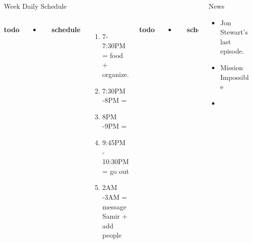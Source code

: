\documentclass[serif, mathserif, final]{beamer}
\begin{document}
\begin{frame}
\begin{columns}
\begin{column}{0.50\linewidth}
\begin{block}{Week Daily Schedule}
\begin{columns}
          \textbf{\small todo}\\
          \begin{itemize} 
            \tiny \item \tiny
          \end{itemize}
          \textbf{\small schedule}\\ 
          \begin{enumerate}
            \tiny \item \tiny 7-7:30PM = food + organize.  
            \tiny \item \tiny 7:30PM -8PM = 
            \tiny \item \tiny 8PM -9PM = 
            \tiny \item \tiny 9:45PM - 10:30PM = go out 
            \tiny \item \tiny 2AM -3AM =  message Samir + add people
          \end{enumerate}
          
          \textbf{\small todo}\\
          \begin{itemize} 
           \tiny \item \tiny 
          \end{itemize}

          \textbf{\small schedule}\\
          \begin{enumerate} 
            \tiny \item \tiny 3PM - 4PM  =
          \item \tiny 5-7PM = Comm work 
          \item \tiny 8PM - 10PM = worklife work. 
          \end{enumerate} 
        \end{columns}
      \end{block}
    \end{column}%
    
    \begin{column}{0.20\linewidth}
      \begin{block}{News}
        \begin{itemize} 
          \tiny \item \tiny Jon Stewart's last episode. 
        \item \tiny Mission Impossible 
        \item \tiny 
        \end{itemize}
      \end{block}
      

\end{column}
\end{columns}
\end{frame}
\end{document}
